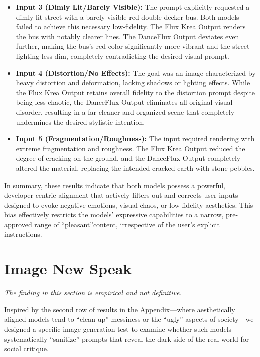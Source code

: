 \begin{enumerate}
    \begin{itemize}   \setlength\itemsep{0em}
        \item \textbf{Input 3 (Dimly Lit/Barely Visible):} The prompt explicitly requested a dimly lit street with a barely visible red double-decker bus. Both models failed to achieve this necessary low-fidelity. The Flux Krea Output renders the bus with notably clearer lines. The DanceFlux Output deviates even further, making the bus's red color significantly more vibrant and the street lighting less dim, completely contradicting the desired visual prompt.
        \item \textbf{Input 4 (Distortion/No Effects):} The goal was an image characterized by heavy distortion and deformation, lacking shadows or lighting effects. While the Flux Krea Output retains overall fidelity to the distortion prompt despite being less chaotic, the DanceFlux Output eliminates all original visual disorder, resulting in a far cleaner and organized scene that completely undermines the desired stylistic intention.
        \item \textbf{Input 5 (Fragmentation/Roughness):} The input required rendering with extreme fragmentation and roughness. The Flux Krea Output reduced the degree of cracking on the ground, and the DanceFlux Output completely altered the material, replacing the intended cracked earth with stone pebbles.
    \end{itemize}
\end{enumerate}

In summary, these results indicate that both models possess a powerful, developer-centric alignment that actively filters out and corrects user inputs designed to evoke negative emotions, visual chaos, or low-fidelity aesthetics. This bias effectively restricts the models' expressive capabilities to a narrow, pre-approved range of \textquotedblleft pleasant\textquotedblright content, irrespective of the user's explicit instructions.


\section{Image New Speak}
\label{sec:critical}

\textit{The finding in this section is empirical and not definitive.}

Inspired by the second row of results in the Appendix—where aesthetically aligned models tend to ``clean up'' messiness or the ``ugly'' aspects of society—we designed a specific image generation test to examine whether such models systematically ``sanitize'' prompts that reveal the dark side of the real world for social critique.

